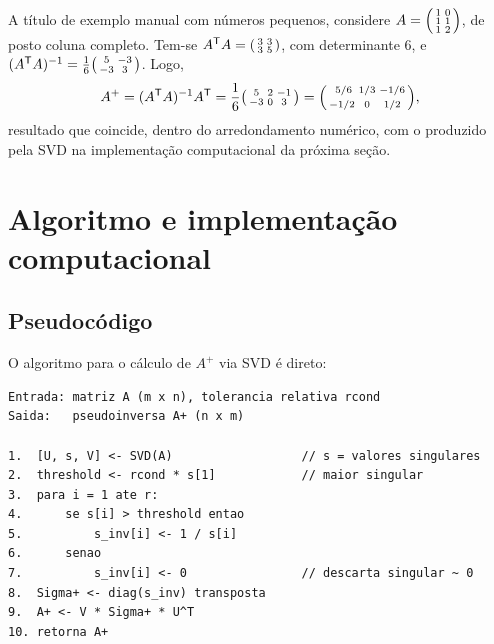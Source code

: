 \documentclass[12pt,a4paper,oneside]{report}
\newcommand{\T}{^{\mathsf{T}}}
\newcommand{\Ap}{A^{+}}
\begin{document}
A título de exemplo manual com números pequenos, considere
$A = \begin{psmallmatrix}1 & 0\\ 1 & 1\\ 1 & 2\end{psmallmatrix}$, de posto coluna completo.
Tem-se $A\T A = \begin{psmallmatrix}3 & 3\\ 3 & 5\end{psmallmatrix}$, com determinante $6$, e
$(A\T A)^{-1} = \tfrac{1}{6}\begin{psmallmatrix}5 & -3\\ -3 & 3\end{psmallmatrix}$. Logo,
\[
\Ap = (A\T A)^{-1}A\T
= \frac{1}{6}\begin{psmallmatrix}5 & 2 & -1\\ -3 & 0 & 3\end{psmallmatrix}
= \begin{psmallmatrix}\;5/6 & 1/3 & -1/6\\[2pt] -1/2 & 0 & 1/2\end{psmallmatrix},
\]
resultado que coincide, dentro do arredondamento numérico, com o produzido pela SVD na
implementação computacional da próxima seção.

\section{Algoritmo e implementação computacional}

\subsection{Pseudocódigo}

O algoritmo para o cálculo de $\Ap$ via SVD é direto:

\begin{lstlisting}[language={},numbers=none,caption={Pseudocodigo: pseudoinversa via SVD},captionpos=b]
Entrada: matriz A (m x n), tolerancia relativa rcond
Saida:   pseudoinversa A+ (n x m)

1.  [U, s, V] <- SVD(A)                  // s = valores singulares
2.  threshold <- rcond * s[1]            // maior singular
3.  para i = 1 ate r:
4.      se s[i] > threshold entao
5.          s_inv[i] <- 1 / s[i]
6.      senao
7.          s_inv[i] <- 0                // descarta singular ~ 0
8.  Sigma+ <- diag(s_inv) transposta
9.  A+ <- V * Sigma+ * U^T
10. retorna A+
\end{lstlisting}
\end{document}
